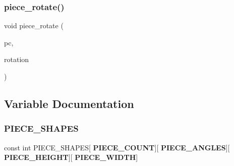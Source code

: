\subsubsection{piece\+\_\+rotate()}
{\footnotesize\ttfamily void piece\+\_\+rotate (\begin{DoxyParamCaption}\item[{struct \textbf{ piece} $\ast$}]{pc,  }\item[{int}]{rotation }\end{DoxyParamCaption})\hspace{0.3cm}{\ttfamily [inline]}}



\subsection{Variable Documentation}
\mbox{\label{piece_8h_a04d86212c54927c5c8e728121c430fde}} 
\subsubsection{P\+I\+E\+C\+E\+\_\+\+S\+H\+A\+P\+ES}
{\footnotesize\ttfamily const int P\+I\+E\+C\+E\+\_\+\+S\+H\+A\+P\+ES[\textbf{ P\+I\+E\+C\+E\+\_\+\+C\+O\+U\+NT}][\textbf{ P\+I\+E\+C\+E\+\_\+\+A\+N\+G\+L\+ES}][\textbf{ P\+I\+E\+C\+E\+\_\+\+H\+E\+I\+G\+HT}][\textbf{ P\+I\+E\+C\+E\+\_\+\+W\+I\+D\+TH}]}

